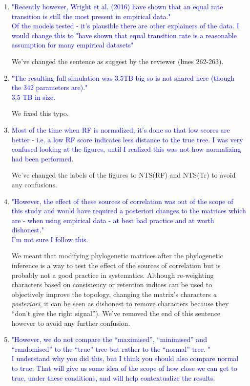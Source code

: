 \documentclass[12pt,letterpaper]{article}
\begin{document}
\begin{enumerate}

\item{\textcolor{blue}{"Recently however, Wright et al. (2016) have shown that an equal rate transition is still the most present in empirical data."\\
Of the models tested - it's plausible there are other explainers of the data. I would change this to "have shown that equal transition rate is a reasonable assumption for many empirical datasets"}}

We've changed the sentence as suggest by the reviewer (lines 262-263).

\item{\textcolor{blue}{"The resulting full simulation was 3.5TB big so is not shared here (though the 342 parameters are)."\\
3.5 TB in size.}}

We fixed this typo.

\item{\textcolor{blue}{Most of the time when RF is normalized, it's done so that low scores are better - i.e. a low RF score indicates less distance to the true tree. I was very confused looking at the figures, until I realized this was not how normalizing had been performed. }}

We've changed the labels of the figures to NTS(RF) and NTS(Tr) to avoid any confusions.

\item{\textcolor{blue}{"However, the effect of these sources of correlation was out of the scope of this study and would have required a posteriori changes to the matrices which are - when using empirical data - at best bad practice and at worth dishonest."\\
I'm not sure I follow this.}}
\label{dishonest}

We meant that modifying phylogenetic matrices after the phylogenetic inference is a way to test the effect of the sources of correlation but is probably not a good practice in systematics.
Although re-weighting characters based on consistency or retention indices can be used to objectively improve the topology, changing the matrix's characters \textit{a posteriori}, it can be seen as dishonest to remove characters because they ``don't give the right signal''). We've removed the end of this sentence however to avoid any further confusion.

\item{\textcolor{blue}{"However, we do not compare the ``maximised'', ``minimised'' and ``randomised'' to the ``true'' tree but rather to the ``normal'' tree. "\\
I understand why you did this, but I think you should also compare normal to true. That will give us some idea of the scope of how close we can get to true, under these conditions, and will help contextualize the results.}}


\end{enumerate}
\end{document}
